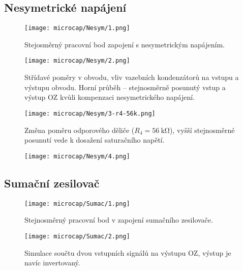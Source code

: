 \subsection{Nesymetrické napájení}
    \begin{figure}[h!]
        \centering
        \texttt{[image: microcap/Nesym/1.png]}
        \centering
        \caption{Stejosměrný pracovní bod zapojení s nesymetrickým napájením.}
        \label{fig:ns-s-pracBod}
    \end{figure}

    \begin{figure}[h!]
        \centering
        \texttt{[image: microcap/Nesym/2.png]}
        \centering
        \caption{Střídavé poměry v obvodu, vliv vazebních kondenzátorů na vstupu a výstupu obvodu. Horní průběh -- stejnosměrně posunutý vstup a výstup OZ kvůli kompenzaci nesymetrického napájení.}
        \label{fig:ns-s-prubeh1}
    \end{figure}

    \begin{figure}[h!]
        \centering
        \texttt{[image: microcap/Nesym/3-r4-56k.png]}
        \centering
        \caption{Změna poměru odporového děliče ($R_4=\qty{56}{\kilo\ohm}$), vyšší stejnosměrné posunutí vede k dosažení saturačního napětí.}
        \label{fig:}
    \end{figure}

    \begin{figure}[h!]
        \centering
        \texttt{[image: microcap/Nesym/4.png]}
        \centering
        \caption{}
        \label{fig:}
    \end{figure}


\clearpage
\subsection{Sumační zesilovač}
        \begin{figure}[h!]
            \centering
            \texttt{[image: microcap/Sumac/1.png]}
            \centering
            \caption{Stejnosměrný pracovní bod v zapojení sumačního zesilovače.}
            \label{fig:}
        \end{figure}

        \begin{figure}[h!]
            \centering
            \texttt{[image: microcap/Sumac/2.png]}
            \centering
            \caption{Simulace součtu dvou vstupních signálů na výstupu OZ, výstup je navíc invertovaný.}
            \label{fig:}
        \end{figure}

